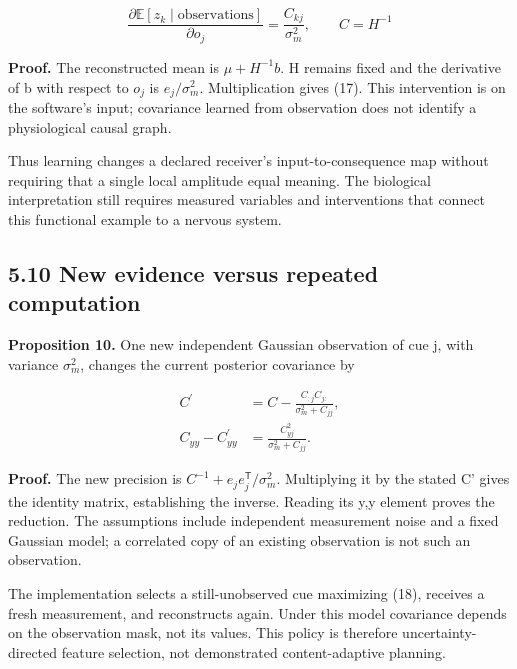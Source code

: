 \documentclass[
  american,
  11pt,
  letterpaper,
]{article}
\begin{document}
\begin{equation}
\frac{\partial\mathbb E[z_k\mid\text{observations}]}{\partial o_j}=\frac{C_{kj}}{\sigma_m^2},\qquad C=H^{-1}\tag{17}
\end{equation}

\textbf{Proof.} The reconstructed mean is \(\mu+H^{-1}b\). H remains fixed and the derivative of b with respect to \(o_j\) is \(e_j/\sigma_m^2\). Multiplication gives (17). This intervention is on the software's input; covariance learned from observation does not identify a physiological causal graph.

Thus learning changes a declared receiver's input-to-consequence map without requiring that a single local amplitude equal meaning. The biological interpretation still requires measured variables and interventions that connect this functional example to a nervous system.

\subsection{5.10 New evidence versus repeated computation}\label{new-evidence-versus-repeated-computation}

\textbf{Proposition 10.} One new independent Gaussian observation of cue j, with variance \(\sigma_m^2\), changes the current posterior covariance by

\begin{equation}
\begin{aligned}C^{\prime}&=C-\frac{C_{:j}C_{j:}}{\sigma_m^2+C_{jj}},\\ C_{yy}-C^{\prime}_{yy}&=\frac{C_{yj}^2}{\sigma_m^2+C_{jj}}.\end{aligned}\tag{18}
\end{equation}

\textbf{Proof.} The new precision is \(C^{-1}+e_je_j^{\mathsf T}/\sigma_m^2\). Multiplying it by the stated C' gives the identity matrix, establishing the inverse. Reading its y,y element proves the reduction. The assumptions include independent measurement noise and a fixed Gaussian model; a correlated copy of an existing observation is not such an observation.

The implementation selects a still-unobserved cue maximizing (18), receives a fresh measurement, and reconstructs again. Under this model covariance depends on the observation mask, not its values. This policy is therefore uncertainty-directed feature selection, not demonstrated content-adaptive planning.
\end{document}
